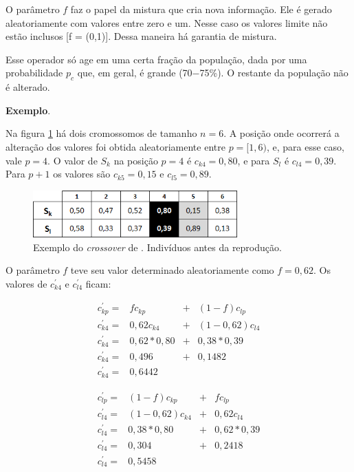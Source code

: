 	O parâmetro $f$ faz o papel da mistura que cria nova informação. Ele é gerado aleatoriamente com valores entre zero e um. Nesse caso os valores limite não estão inclusos [f = (0,1)]. Dessa maneira há garantia de mistura.
	
	Esse operador só age em uma certa fração da população, dada por uma probabilidade $p_c$ que, em geral, é grande (70$-$75\%). O restante da população não é alterado.

\textbf{Exemplo}.

Na figura \ref{fig:cross2004_tabelaAntes} há dois cromossomos de tamanho $n = 6$. A posição onde ocorrerá a alteração dos valores foi obtida aleatoriamente entre $p = [1,6)$, e, para esse caso, vale $p = 4$. O valor de $S_k$ na posição $p = 4$ é $c_{k4} = 0,80$, e para $S_l$ é $c_{l4} = 0,39$. Para $p + 1$ os valores são $c_{k5} = 0,15$ e $c_{l5} = 0,89$.

\begin{figure}[htbp]
	\centering
		\includegraphics[width=0.70\textwidth]{figs/materiais_metodo/autovalores_com_ga/cross2004_tabelaAntes.png}
	\caption{Exemplo do \emph{crossover} de \cite{metodo2004}. Indivíduos antes da reprodução.}
	\label{fig:cross2004_tabelaAntes}
\end{figure}

O parâmetro $f$ teve seu valor determinado aleatoriamente como $f = 0,62$. Os valores de $c^{'}_{k4}$ e $c^{'}_{l4}$ ficam:

\begin{equation}\label{eq:ck4}
	\begin{array}{lccl}
		c^{'}_{kp} = & f c_{kp} & + & (1 - f) c_{lp} 						\\
		c^{'}_{k4} = & 0,62 c_{k4} & + & (1 - 0,62) c_{l4} 			\\
		c^{'}_{k4} = & 0,62 * 0,80 & + & 0,38 * 0,39 						\\		
		c^{'}_{k4} = & 0,496 & + & 0,1482	\\		
		c^{'}_{k4} = & 0,6442 &  & 
	\end{array}
\end{equation}

\begin{equation}\label{eq:cl4}
	\begin{array}{lccl}
		c^{'}_{lp} = & (1-f) c_{kp} & + & f c_{lp} 						\\
		c^{'}_{l4} = & (1-0,62) c_{k4} & + & 0,62 c_{l4} 						\\
		c^{'}_{l4} = & 0,38 * 0,80 & + & 0,62 * 0,39 						\\
		c^{'}_{l4} = & 0,304 & + & 0,2418 						\\
		c^{'}_{l4} = & 0,5458 &  & 
	\end{array}
\end{equation}

